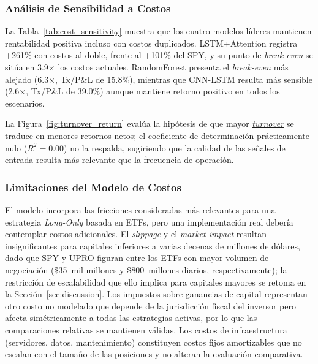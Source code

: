 
\subsubsection{An\'alisis de Sensibilidad a Costos}
\label{subsec:cost_sensitivity}

La Tabla~\ref{tab:cost_sensitivity} muestra que los cuatro modelos l\'ideres mantienen rentabilidad positiva incluso con costos duplicados. LSTM+Attention registra +261\% con costos al doble, frente al +101\% del SPY, y su punto de \textit{break-even} se sit\'ua en 3.9$\times$ los costos actuales. RandomForest presenta el \textit{break-even} m\'as alejado (6.3$\times$, Tx/P\&L de 15.8\%), mientras que CNN-LSTM resulta m\'as sensible (2.6$\times$, Tx/P\&L de 39.0\%) aunque mantiene retorno positivo en todos los escenarios.

La Figura~\ref{fig:turnover_return} eval\'ua la hip\'otesis de que mayor \hyperlink{glos:turnover}{\textit{turnover}} se traduce en menores retornos netos; el coeficiente de determinaci\'on pr\'acticamente nulo ($R^2 = 0.00$) no la respalda, sugiriendo que la calidad de las se\~nales de entrada resulta m\'as relevante que la frecuencia de operaci\'on.


\subsubsection{Limitaciones del Modelo de Costos}
\label{subsec:costs_not_modeled}

El modelo incorpora las fricciones consideradas m\'as relevantes para una estrategia \textit{Long-Only} basada en ETFs, pero una implementaci\'on real deber\'ia contemplar costos adicionales. El \textit{slippage} y el \textit{market impact} resultan insignificantes para capitales inferiores a varias decenas de millones de d\'olares, dado que SPY y UPRO figuran entre los ETFs con mayor volumen de negociaci\'on (\$35~mil millones y \$800~millones diarios, respectivamente); la restricci\'on de escalabilidad que ello implica para capitales mayores se retoma en la Secci\'on~\ref{sec:discussion}. Los impuestos sobre ganancias de capital representan otro costo no modelado que depende de la jurisdicci\'on fiscal del inversor pero afecta sim\'etricamente a todas las estrategias activas, por lo que las comparaciones relativas se mantienen v\'alidas. Los costos de infraestructura (servidores, datos, mantenimiento) constituyen costos fijos amortizables que no escalan con el tama\~no de las posiciones y no alteran la evaluaci\'on comparativa.
